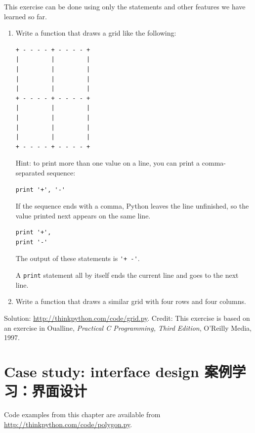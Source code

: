 \documentclass[10pt]{book}
\begin{document}
\begin{CJK}{UTF8}{gbsn}
\begin{exercise}
This exercise can be
done using only the statements and other features we have learned so
far.  

\begin{enumerate}

\item Write a function that draws a grid like the following:

\begin{verbatim}
+ - - - - + - - - - +
|         |         |
|         |         |
|         |         |
|         |         |
+ - - - - + - - - - +
|         |         |
|         |         |
|         |         |
|         |         |
+ - - - - + - - - - +
\end{verbatim}
%
Hint: to print more than one value on a line, you can print
a comma-separated sequence:

\begin{verbatim}
print '+', '-'
\end{verbatim}
%
If the sequence ends with a comma, Python leaves the line unfinished,
so the value printed next appears on the same line.

\begin{verbatim}
print '+', 
print '-'
\end{verbatim}
%
The output of these statements is \verb"'+ -'".

A {\tt print} statement all by itself ends the current line and
goes to the next line.

\item Write a function that draws a similar grid
with four rows and four columns.

\end{enumerate}

Solution: \url{http://thinkpython.com/code/grid.py}.
Credit: This exercise is based on an exercise in Oualline, {\em
    Practical C Programming, Third Edition}, O'Reilly Media, 1997.

\end{exercise}





\chapter{Case study: interface design 案例学习：界面设计}
\label{turtlechap}

Code examples from this chapter are available from
\url{http://thinkpython.com/code/polygon.py}.


\end{CJK}
\end{document}
